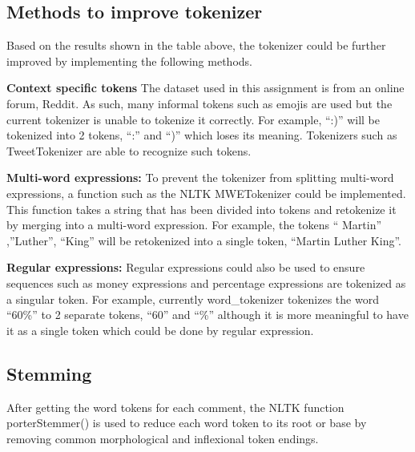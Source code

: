 \documentclass[sigconf,nonacm=true]{acmart}
\begin{document}
\subsection{Methods to improve tokenizer}
Based on the results shown in the table above, the tokenizer could be further improved by implementing the following methods. \medskip


{\bf Context specific tokens}
The dataset used in this assignment is from an online forum, Reddit. As such, many informal tokens such as emojis are used but the current tokenizer is unable to tokenize it correctly. For example, “:)” will be tokenized into 2 tokens, “:” and “)” which loses its meaning. Tokenizers such as TweetTokenizer are able to recognize such tokens.\bigskip

 {\bf Multi-word expressions:}
To prevent the tokenizer from splitting multi-word expressions, a function such as the NLTK MWETokenizer could be implemented. This function takes a string that has been divided into tokens and re\-tokenize it by merging into a multi-word expression. For example, the tokens “ Martin” ,”Luther”, “King” will be re\-tokenized into a single token, “Martin Luther King”. \smallskip

 {\bf Regular expressions:}
Regular expressions could also be used to ensure sequences such as money expressions and percentage expressions are tokenized as a singular token. For example, currently word\_tokenizer tokenizes the word “60\%” to 2 separate tokens, “60” and “\%” although it is more meaningful to have it as a single token which could be done by regular expression. 



\subsection{Stemming}
After getting the word tokens for each comment, the NLTK function porterStemmer() is used to reduce each word token to its root or base by removing common morphological and inflexional token endings.
\end{document}
